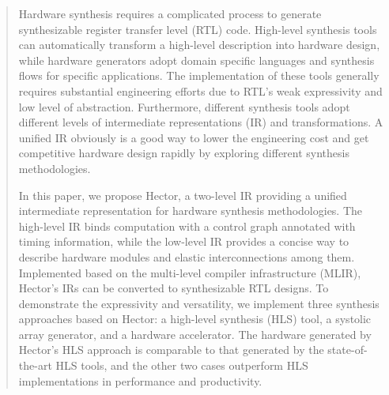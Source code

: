 \begin{abstract}
Hardware synthesis requires a complicated process to generate synthesizable register transfer level (RTL) code. High-level synthesis tools can automatically transform a high-level description into hardware design, while hardware generators adopt domain specific languages and synthesis flows for specific applications. The implementation of these tools generally requires substantial engineering efforts due to RTL's weak expressivity and low level of abstraction. Furthermore, different synthesis tools adopt different levels of intermediate representations (IR) and transformations. A unified IR obviously is a good way to lower the engineering cost and get competitive hardware design rapidly by exploring different synthesis methodologies. 

In this paper, we propose Hector, a two-level IR providing a unified intermediate representation for hardware synthesis methodologies. The high-level IR binds computation with a control graph annotated with timing information, while the low-level IR provides a concise way to describe hardware modules and elastic interconnections among them. Implemented based on the multi-level compiler infrastructure (MLIR), Hector's IRs can be converted to synthesizable RTL designs. To demonstrate the expressivity and versatility, we implement three synthesis approaches based on Hector: a high-level synthesis (HLS) tool, a systolic array generator, and a hardware accelerator. The hardware generated by Hector's HLS approach is comparable to that generated by the state-of-the-art HLS tools, and the other two cases outperform HLS implementations in performance and productivity.

\end{abstract}
